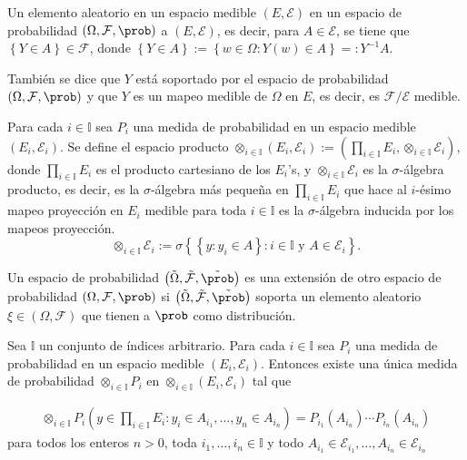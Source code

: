 \begin{Def}
Un elemento aleatorio en un espacio medible $\left(E,\mathcal{E}\right)$ en un espacio de probabilidad $\left(\Omega,\mathcal{F},\prob\right)$ a $\left(E,\mathcal{E}\right)$, es decir,
para $A\in \mathcal{E}$,  se tiene que $\left\{Y\in A\right\}\in\mathcal{F}$, donde $\left\{Y\in A\right\}:=\left\{w\in\Omega:Y\left(w\right)\in A\right\}=:Y^{-1}A$.
\end{Def}

\begin{Note}
Tambi\'en se dice que $Y$ est\'a soportado por el espacio de probabilidad $\left(\Omega,\mathcal{F},\prob\right)$ y que $Y$ es un mapeo medible de $\Omega$ en $E$, es decir, es $\mathcal{F}/\mathcal{E}$ medible.
\end{Note}

\begin{Def}
Para cada $i\in \mathbb{I}$ sea $P_{i}$ una medida de probabilidad en un espacio medible $\left(E_{i},\mathcal{E}_{i}\right)$. Se define el espacio producto
$\otimes_{i\in\mathbb{I}}\left(E_{i},\mathcal{E}_{i}\right):=\left(\prod_{i\in\mathbb{I}}E_{i},\otimes_{i\in\mathbb{I}}\mathcal{E}_{i}\right)$, donde $\prod_{i\in\mathbb{I}}E_{i}$ es el producto cartesiano de los $E_{i}$'s, y $\otimes_{i\in\mathbb{I}}\mathcal{E}_{i}$ es la $\sigma$-\'algebra producto, es decir, es la $\sigma$-\'algebra m\'as peque\~na en $\prod_{i\in\mathbb{I}}E_{i}$ que hace al $i$-\'esimo mapeo proyecci\'on en $E_{i}$ medible para toda $i\in\mathbb{I}$ es la $\sigma$-\'algebra inducida por los mapeos proyecci\'on. $$\otimes_{i\in\mathbb{I}}\mathcal{E}_{i}:=\sigma\left\{\left\{y:y_{i}\in A\right\}:i\in\mathbb{I}\textrm{ y }A\in\mathcal{E}_{i}\right\}.$$
\end{Def}

\begin{Def}
Un espacio de probabilidad $\left(\tilde{\Omega},\tilde{\mathcal{F}},\tilde{\prob}\right)$ es una extensi\'on de otro espacio de probabilidad $\left(\Omega,\mathcal{F},\prob\right)$ si $\left(\tilde{\Omega},\tilde{\mathcal{F}},\tilde{\prob}\right)$ soporta un elemento aleatorio $\xi\in\left(\Omega,\mathcal{F}\right)$ que tienen a $\prob$ como distribuci\'on.
\end{Def}

\begin{Teo}
Sea $\mathbb{I}$ un conjunto de \'indices arbitrario. Para cada $i\in\mathbb{I}$ sea $P_{i}$ una medida de probabilidad en un espacio medible $\left(E_{i},\mathcal{E}_{i}\right)$. Entonces existe una \'unica medida de probabilidad $\otimes_{i\in\mathbb{I}}P_{i}$ en $\otimes_{i\in\mathbb{I}}\left(E_{i},\mathcal{E}_{i}\right)$ tal que 

\begin{eqnarray*}
\otimes_{i\in\mathbb{I}}P_{i}\left(y\in\prod_{i\in\mathbb{I}}E_{i}:y_{i}\in A_{i_{1}},\ldots,y_{n}\in A_{i_{n}}\right)=P_{i_{1}}\left(A_{i_{n}}\right)\cdots P_{i_{n}}\left(A_{i_{n}}\right)
\end{eqnarray*}
para todos los enteros $n>0$, toda $i_{1},\ldots,i_{n}\in\mathbb{I}$ y todo $A_{i_{1}}\in\mathcal{E}_{i_{1}},\ldots,A_{i_{n}}\in\mathcal{E}_{i_{n}}$
\end{Teo}

